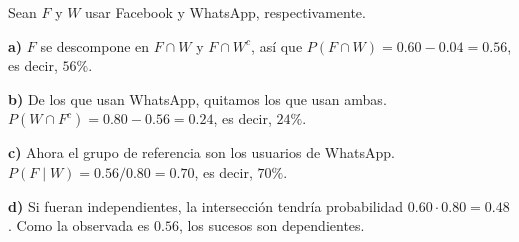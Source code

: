 Sean $F$ y $W$ usar Facebook y WhatsApp, respectivamente.

\textbf{a)} $F$ se descompone en $F\cap W$ y $F\cap W^c$,
así que $P(F\cap W)=0.60-0.04=0.56$, es decir, $\boxed{56\%}$.

\textbf{b)} De los que usan WhatsApp, quitamos los que usan ambas.
$P(W\cap F^c)=0.80-0.56=0.24$, es decir, $\boxed{24\%}$.

\textbf{c)} Ahora el grupo de referencia son los usuarios de WhatsApp.
$P(F\mid W)=0.56/0.80=0.70$, es decir, $\boxed{70\%}$.

\textbf{d)} Si fueran independientes, la intersección tendría
probabilidad $0.60\cdot0.80=0.48$. Como la observada es $0.56$,
los sucesos son dependientes.
